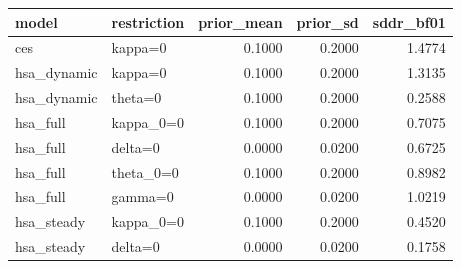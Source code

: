 \begin{tabular}{llrrr}
\toprule
model & restriction & prior\_mean & prior\_sd & sddr\_bf01 \\
\midrule
ces & kappa=0 & 0.1000 & 0.2000 & 1.4774 \\
hsa\_dynamic & kappa=0 & 0.1000 & 0.2000 & 1.3135 \\
hsa\_dynamic & theta=0 & 0.1000 & 0.2000 & 0.2588 \\
hsa\_full & kappa\_0=0 & 0.1000 & 0.2000 & 0.7075 \\
hsa\_full & delta=0 & 0.0000 & 0.0200 & 0.6725 \\
hsa\_full & theta\_0=0 & 0.1000 & 0.2000 & 0.8982 \\
hsa\_full & gamma=0 & 0.0000 & 0.0200 & 1.0219 \\
hsa\_steady & kappa\_0=0 & 0.1000 & 0.2000 & 0.4520 \\
hsa\_steady & delta=0 & 0.0000 & 0.0200 & 0.1758 \\
\bottomrule
\end{tabular}

